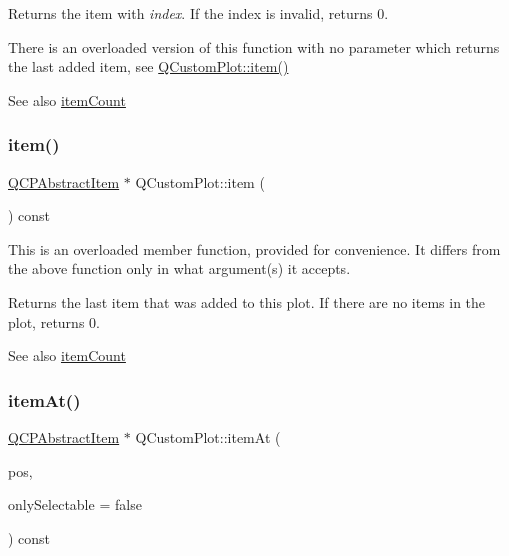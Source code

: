 Returns the item with {\itshape index}. If the index is invalid, returns 0.

There is an overloaded version of this function with no parameter which returns the last added item, see \hyperlink{class_q_custom_plot_ac042f2e78edd228ccf2f26b7fe215239}{Q\+Custom\+Plot\+::item()}

\begin{DoxySeeAlso}{See also}
\hyperlink{class_q_custom_plot_a16025daf0341f9362be3080e404424c2}{item\+Count} 
\end{DoxySeeAlso}
\mbox{\label{class_q_custom_plot_a12eb2a283cf10a8a9176c01c0443e83e}} 
\subsubsection{\texorpdfstring{item()}{item()}\hspace{0.1cm}{\footnotesize\ttfamily [2/2]}}
{\footnotesize\ttfamily \hyperlink{class_q_c_p_abstract_item}{Q\+C\+P\+Abstract\+Item} $\ast$ Q\+Custom\+Plot\+::item (\begin{DoxyParamCaption}{ }\end{DoxyParamCaption}) const}

This is an overloaded member function, provided for convenience. It differs from the above function only in what argument(s) it accepts.

Returns the last item that was added to this plot. If there are no items in the plot, returns 0.

\begin{DoxySeeAlso}{See also}
\hyperlink{class_q_custom_plot_a16025daf0341f9362be3080e404424c2}{item\+Count} 
\end{DoxySeeAlso}
\mbox{\label{class_q_custom_plot_ac08578e0e6c059c83a8d340ba0038e8e}} 
\subsubsection{\texorpdfstring{item\+At()}{itemAt()}}
{\footnotesize\ttfamily \hyperlink{class_q_c_p_abstract_item}{Q\+C\+P\+Abstract\+Item} $\ast$ Q\+Custom\+Plot\+::item\+At (\begin{DoxyParamCaption}\item[{const Q\+PointF \&}]{pos,  }\item[{bool}]{only\+Selectable = {\ttfamily false} }\end{DoxyParamCaption}) const}

